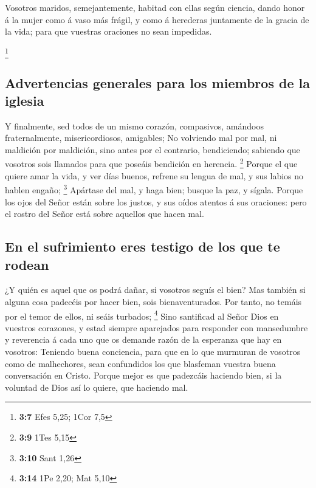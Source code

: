  Vosotros maridos, semejantemente, habitad con ellas según
ciencia, dando honor á la mujer como á vaso más frágil, y como á
herederas juntamente de la gracia de la vida; para que vuestras
oraciones no sean impedidas.

\footnote{\textbf{3:7} Efes 5,25; 1Cor 7,5}

\hypertarget{advertencias-generales-para-los-miembros-de-la-iglesia}{%
\subsection{Advertencias generales para los miembros de la
iglesia}\label{advertencias-generales-para-los-miembros-de-la-iglesia}}

 Y finalmente, sed todos de un mismo corazón, compasivos,
amándoos fraternalmente, misericordiosos, amigables;  No
volviendo mal por mal, ni maldición por maldición, sino antes por el
contrario, bendiciendo; sabiendo que vosotros sois llamados para que
poseáis bendición en herencia. \footnote{\textbf{3:9} 1Tes 5,15}
 Porque el que quiere amar la vida, y ver días buenos,
refrene su lengua de mal, y sus labios no hablen engaño; \footnote{\textbf{3:10}
  Sant 1,26}  Apártase del mal, y haga bien; busque la paz,
y sígala.  Porque los ojos del Señor están sobre los
justos, y sus oídos atentos á sus oraciones: pero el rostro del Señor
está sobre aquellos que hacen mal.

\hypertarget{en-el-sufrimiento-eres-testigo-de-los-que-te-rodean}{%
\subsection{En el sufrimiento eres testigo de los que te
rodean}\label{en-el-sufrimiento-eres-testigo-de-los-que-te-rodean}}

 ¿Y quién es aquel que os podrá dañar, si vosotros seguís
el bien?  Mas también si alguna cosa padecéis por hacer
bien, sois bienaventurados. Por tanto, no temáis por el temor de ellos,
ni seáis turbados; \footnote{\textbf{3:14} 1Pe 2,20; Mat 5,10}
 Sino santificad al Señor Dios en vuestros corazones, y
estad siempre aparejados para responder con mansedumbre y reverencia á
cada uno que os demande razón de la esperanza que hay en vosotros:
 Teniendo buena conciencia, para que en lo que murmuran de
vosotros como de malhechores, sean confundidos los que blasfeman vuestra
buena conversación en Cristo.  Porque mejor es que
padezcáis haciendo bien, si la voluntad de Dios así lo quiere, que
haciendo mal.

